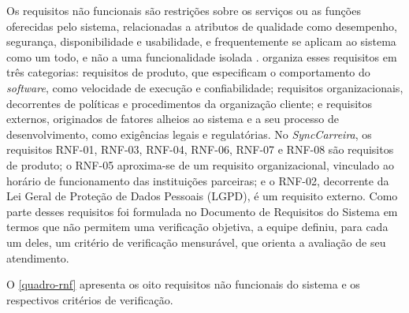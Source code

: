 Os requisitos não funcionais são restrições sobre os serviços ou as funções oferecidas pelo sistema, relacionadas a atributos de qualidade como desempenho, segurança, disponibilidade e usabilidade, e frequentemente se aplicam ao sistema como um todo, e não a uma funcionalidade isolada \cite{pressman2021}.  organiza esses requisitos em três categorias: requisitos de produto, que especificam o comportamento do \textit{software}, como velocidade de execução e confiabilidade; requisitos organizacionais, decorrentes de políticas e procedimentos da organização cliente; e requisitos externos, originados de fatores alheios ao sistema e a seu processo de desenvolvimento, como exigências legais e regulatórias. No \textit{SyncCarreira}, os requisitos RNF-01, RNF-03, RNF-04, RNF-06, RNF-07 e RNF-08 são requisitos de produto; o RNF-05 aproxima-se de um requisito organizacional, vinculado ao horário de funcionamento das instituições parceiras; e o RNF-02, decorrente da Lei Geral de Proteção de Dados Pessoais (LGPD), é um requisito externo. Como parte desses requisitos foi formulada no Documento de Requisitos do Sistema em termos que não permitem uma verificação objetiva, a equipe definiu, para cada um deles, um critério de verificação mensurável, que orienta a avaliação de seu atendimento.

O \autoref{quadro-rnf} apresenta os oito requisitos não funcionais do sistema e os respectivos critérios de verificação.

